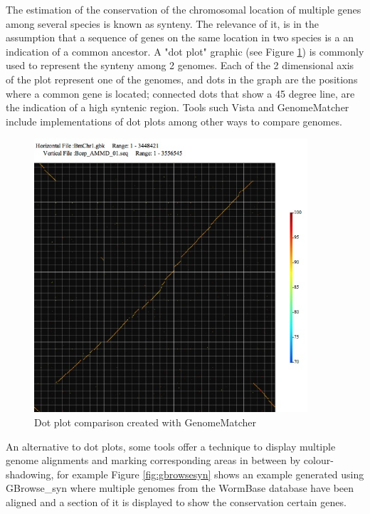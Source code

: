 The estimation of the conservation of the chromosomal location of multiple genes among several species is known as synteny. The relevance of it, is in the assumption that a sequence of genes on the same location in two species is a an indication of a common ancestor. A "dot plot" graphic (see Figure \ref{fig:dotplot}) is commonly used to represent the synteny among  2 genomes. Each of the 2 dimensional axis of the plot represent one of the genomes, and dots in the graph are the positions where a common gene is located; connected dots that show a 45 degree line, are the indication of a high syntenic region. Tools such Vista \cite{FRA2004} and GenomeMatcher \cite{OHT2008} include implementations of dot plots among other ways to compare genomes.

\begin{figure}  
\centering
\includegraphics[width=4in]{figures/dotplot.jpg}
\caption[Dot plot comparison created with GenomeMatcher.]{Dot plot comparison created with GenomeMatcher
\label{fig:dotplot}}
\end{figure}

An alternative to dot plots, some tools offer a technique to display multiple genome alignments and marking corresponding areas in between by colour-shadowing, for example Figure \ref{fig:gbrowsesyn} shows an example generated using GBrowse\_syn \cite{MCK2010} where multiple genomes from the WormBase database have been aligned and a section of it is displayed to show the conservation certain genes.

